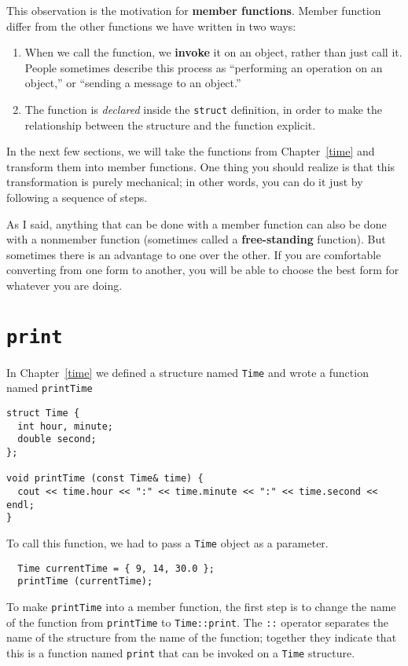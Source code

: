 This observation is the motivation for {\bf member functions}.
Member function differ from the other functions we have written
in two ways:

\begin{enumerate}

\item When we call the function, we {\bf invoke} it on an
object, rather than just call it.  People sometimes describe
this process as ``performing an operation on an object,'' or
``sending a message to an object.''

\item The function is {\em declared} inside the {\tt struct}
definition, in order to make the relationship between the
structure and the function explicit.

\end{enumerate}

In the next few sections, we will take the functions from
Chapter~\ref{time} and transform them into member functions.
One thing you should realize is that this transformation is
purely mechanical; in other words, you can do it just by following
a sequence of steps.


As I said, anything that can be done with a member function can
also be done with a nonmember function (sometimes called a
{\bf free-standing} function).   But sometimes there is an
advantage to one over the other.  If you are comfortable converting
from one form to another, you will be able to choose the best
form for whatever you are doing.

\section{{\tt print}}

In Chapter~\ref{time} we defined a structure named {\tt Time}
and wrote a function named {\tt printTime}

\begin{verbatim}
struct Time {
  int hour, minute;
  double second;
};

void printTime (const Time& time) {
  cout << time.hour << ":" << time.minute << ":" << time.second << endl;
}
\end{verbatim}
%
To call this function, we had to pass a {\tt Time} object as
a parameter.

\begin{verbatim}
  Time currentTime = { 9, 14, 30.0 };
  printTime (currentTime);
\end{verbatim}
%
To make {\tt printTime} into a member function, the
first step is to change the name of the function from {\tt printTime}
to {\tt Time::print}.  The {\tt ::} operator separates the name
of the structure from the name of the function; together they
indicate that this is a function named {\tt print} that can be
invoked on a {\tt Time} structure.

